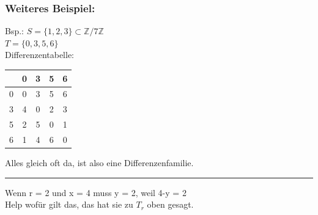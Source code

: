 \documentclass{article} %
\begin{document}
\subsubsection*{Weiteres Beispiel:}
\begin{mybox}
 Bsp.: $S = \{1,2,3\} \subset \mathbb{Z}/7\mathbb{Z}$ \\
 $ T = \{0,3,5,6\}$\\
  Differenzentabelle: 
  \begin{table}[H]
      \centering
      \begin{tabular}{c|cccc}
      &0&3&5&6\\ \hline
           0&0&3&5&6  \\
           3&4&0&2&3 \\
           5&2&5&0&1 \\
           6&1&4&6&0
      \end{tabular}
  \end{table}
  Alles gleich oft da, ist also eine Differenzenfamilie. 
  
  \hrule
  
  Wenn r = 2 und x = 4 muss y = 2, weil 4-y = 2 \\
  Help wofür gilt das, das hat sie zu $T_r$ oben gesagt. 
\end{mybox}
\end{document}
